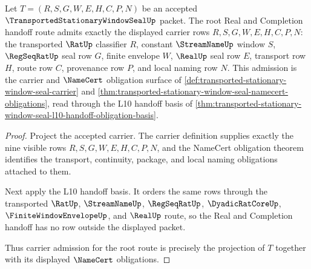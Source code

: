 \begin{theorem}
\label{thm:transported-stationary-window-seal-root-carrier-admission}
Let $T=(R,S,G,W,E,H,C,P,N)$ be an accepted $\TransportedStationaryWindowSealUp$ packet. The root Real and Completion handoff route admits exactly the displayed carrier rows $R,S,G,W,E,H,C,P,N$: the transported $\RatUp$ classifier $R$, constant $\StreamNameUp$ window $S$, $\RegSeqRatUp$ seal row $G$, finite envelope $W$, $\RealUp$ seal row $E$, transport row $H$, route row $C$, provenance row $P$, and local naming row $N$. This admission is the carrier and $\NameCert$ obligation surface of \autoref{def:transported-stationary-window-seal-carrier} and \autoref{thm:transported-stationary-window-seal-namecert-obligations}, read through the L10 handoff basis of \autoref{thm:transported-stationary-window-seal-l10-handoff-obligation-basis}.
\end{theorem}
\begin{proof}
Project the accepted carrier. The carrier definition supplies exactly the nine visible rows $R,S,G,W,E,H,C,P,N$, and the NameCert obligation theorem identifies the transport, continuity, package, and local naming obligations attached to them.

Next apply the L10 handoff basis. It orders the same rows through the transported $\RatUp$, $\StreamNameUp$, $\RegSeqRatUp$, $\DyadicRatCoreUp$, $\FiniteWindowEnvelopeUp$, and $\RealUp$ route, so the Real and Completion handoff has no row outside the displayed packet.

Thus carrier admission for the root route is precisely the projection of $T$ together with its displayed $\NameCert$ obligations.
\end{proof}

